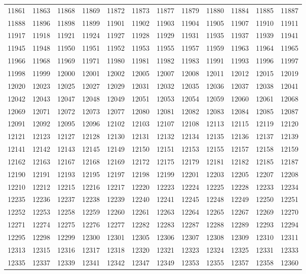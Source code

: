 \begin{center}
\begin{longtable}{llllllllllll}
11861 &11863 &11868 &11869 &11872 &11873 &11877 &11879 &11880 &11884 &11885 &11887 \\
11888 &11896 &11898 &11899 &11901 &11902 &11903 &11904 &11905 &11907 &11910 &11911 \\
11917 &11918 &11921 &11924 &11927 &11928 &11929 &11931 &11935 &11937 &11939 &11941 \\
11945 &11948 &11950 &11951 &11952 &11953 &11955 &11957 &11959 &11963 &11964 &11965 \\
11966 &11968 &11969 &11971 &11980 &11981 &11982 &11983 &11991 &11993 &11996 &11997 \\
11998 &11999 &12000 &12001 &12002 &12005 &12007 &12008 &12011 &12012 &12015 &12019 \\
12020 &12023 &12025 &12027 &12029 &12031 &12032 &12035 &12036 &12037 &12038 &12041 \\
12042 &12043 &12047 &12048 &12049 &12051 &12053 &12054 &12059 &12060 &12061 &12068 \\
12069 &12071 &12072 &12073 &12077 &12080 &12081 &12082 &12083 &12084 &12085 &12087 \\
12091 &12092 &12095 &12096 &12102 &12103 &12107 &12108 &12113 &12115 &12119 &12120 \\
12121 &12123 &12127 &12128 &12130 &12131 &12132 &12134 &12135 &12136 &12137 &12139 \\
12141 &12142 &12143 &12145 &12149 &12150 &12151 &12153 &12155 &12157 &12158 &12159 \\
12162 &12163 &12167 &12168 &12169 &12172 &12175 &12179 &12181 &12182 &12185 &12187 \\
12190 &12191 &12193 &12195 &12197 &12198 &12199 &12201 &12203 &12205 &12207 &12208 \\
12210 &12212 &12215 &12216 &12217 &12220 &12223 &12224 &12225 &12228 &12233 &12234 \\
12235 &12236 &12237 &12238 &12239 &12240 &12241 &12245 &12248 &12249 &12250 &12251 \\
12252 &12253 &12258 &12259 &12260 &12261 &12263 &12264 &12265 &12267 &12269 &12270 \\
12271 &12274 &12275 &12276 &12277 &12282 &12283 &12287 &12288 &12289 &12293 &12294 \\
12295 &12298 &12299 &12300 &12301 &12305 &12306 &12307 &12308 &12309 &12310 &12311 \\
12313 &12315 &12316 &12317 &12318 &12320 &12321 &12323 &12324 &12325 &12331 &12333 \\
12335 &12337 &12339 &12341 &12342 &12347 &12349 &12353 &12355 &12357 &12358 &12360 \\

\end{longtable}
\end{center}
